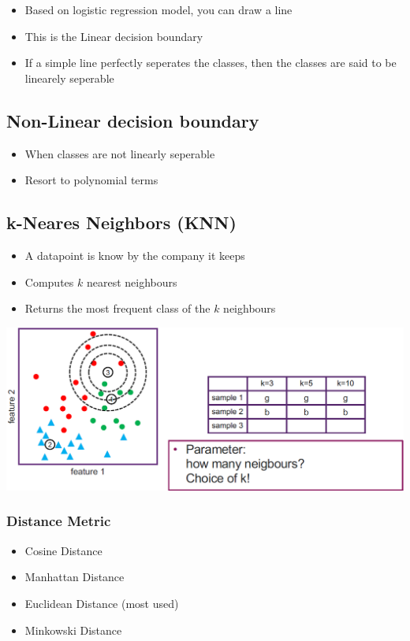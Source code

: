 \begin{itemize}
    \item Based on logistic regression model, you can draw a line
    \item This is the Linear decision boundary
    \item If a simple line perfectly seperates the classes, then the classes are said to be linearely seperable
\end{itemize}

\subsection{Non-Linear decision boundary}
\begin{itemize}
    \item When classes are not linearly seperable
    \item Resort to polynomial terms
\end{itemize}

\subsection{k-Neares Neighbors (KNN)}
\begin{itemize}
    \item A datapoint is know by the company it keeps
    \item Computes $k$ nearest neighbours
    \item Returns the most frequent class of the $k$ neighbours
\end{itemize}
\includegraphics[width=0.8\linewidth]{./img/knn.png}
\subsubsection{Distance Metric}
\begin{itemize}
    \item Cosine Distance
    \item Manhattan Distance
    \item Euclidean Distance (most used)
    \item Minkowski Distance
\end{itemize}
